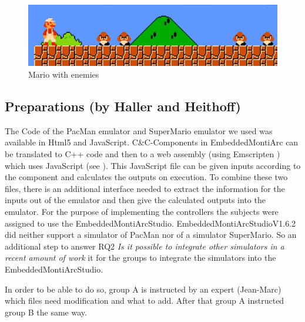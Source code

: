 \begin{figure}[!h]
	\centering
	\includegraphics[scale=0.55]{pictures/Mario4.PNG}
	\caption{Mario with enemies}
	\label{fig:marioFight}
\end{figure}


\subsection{Preparations (by Haller and Heithoff)}
The Code of the PacMan emulator \cite{pacmanLink} and SuperMario emulator \cite{marioLink} we used was available in Html5 and JavaScript. C\&C-Components in EmbeddedMontiArc can be translated to C++ code and then to a web assembly (using Emscripten \cite{emscirpten}) which uses JavaScript (see \cite{bertram2017component}). This JavaScript file can be given inputs according to the component and calculates the outputs on execution. To combine these two files, there is an additional interface needed to extract the information for the inputs out of the emulator and then give the calculated outputs into the emulator.
For the purpose of implementing the controllers the subjects were assigned to use the EmbeddedMontiArcStudio.
EmbeddedMontiArcStudioV1.6.2 did neither support a simulator of PacMan nor of a simulator SuperMario. So an additional step to answer RQ2 \textit{Is it possible to integrate other simulators in a recent amount of work} it for the groups to integrate the simulators into the EmbeddedMontiArcStudio.

In order to be able to do so, group A is instructed by an expert (Jean-Marc) which files need modification and what to add. After that group A instructed group B the same way.


